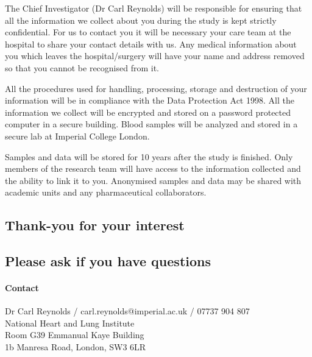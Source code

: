 \documentclass[a4paper,10pt]{article}
\begin{document}
The Chief Investigator (Dr Carl Reynolds) will be responsible for ensuring that all the information we collect about you during the study is kept strictly confidential. For us to contact you it will be necessary your care team at the hospital to share your contact details with us. 
Any medical information about you which leaves the hospital/surgery will have your name and address removed so that you cannot be recognised from it. 

All the procedures used for handling, processing, storage and destruction of your information will be in compliance with the Data Protection Act 1998. All the information we collect will be encrypted and stored on a password protected computer in a secure building. Blood samples will be analyzed and stored in a secure lab at Imperial College London. 

Samples and data will be stored for 10 years after the study is finished. Only members of the research team will have access to the information collected and the ability to link it to you. Anonymised samples and data may be shared with academic units and any pharmaceutical collaborators.

\begin{centering}
\subsection*{Thank-you for your interest}
\subsection*{Please ask if you have questions}
\end{centering}

\vspace{1cm}

\paragraph{Contact} 
\begin{flushleft}
Dr Carl Reynolds / carl.reynolds@imperial.ac.uk / 07737 904 807 \\ 
National Heart and Lung Institute\\
Room G39 Emmanual Kaye Building\\
1b Manresa Road, London, SW3 6LR
\end{flushleft}


 
\end{document}
